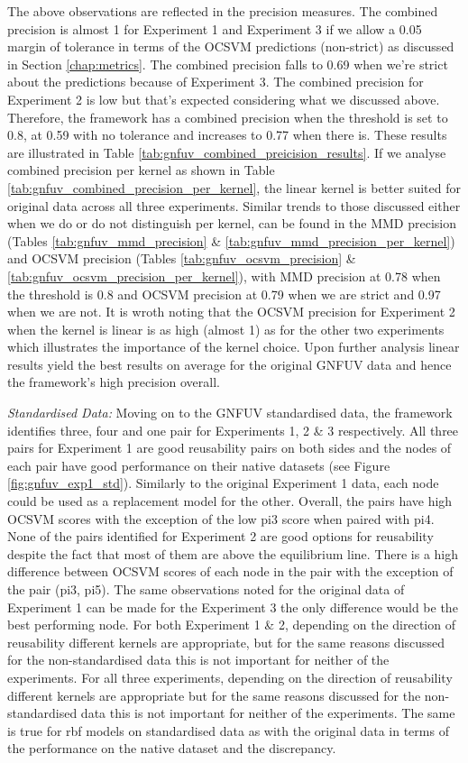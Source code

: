 \documentclass{mpaper}
\begin{document}
The above observations are reflected in the precision measures. The combined precision is almost 1 for Experiment 1 and Experiment 3 if we allow a 0.05 margin of tolerance in terms of the OCSVM predictions (non-strict) as discussed in Section \ref{chap:metrics}. The combined precision falls to 0.69 when we're strict about the predictions because of Experiment 3. The combined precision for Experiment 2 is low but that's expected considering what we discussed above. Therefore, the framework has a combined precision when the threshold is set to 0.8, at 0.59 with no tolerance and increases to 0.77 when there is. These results are illustrated in Table \ref{tab:gnfuv_combined_preicision_results}. If we analyse combined precision per kernel as shown in Table \ref{tab:gnfuv_combined_precision_per_kernel}, the linear kernel is better suited for original data across all three experiments. Similar trends to those discussed either when we do or do not distinguish per kernel, can be found in the MMD precision (Tables \ref{tab:gnfuv_mmd_precision} \& \ref{tab:gnfuv_mmd_precision_per_kernel}) and OCSVM precision (Tables \ref{tab:gnfuv_ocsvm_precision} \& \ref{tab:gnfuv_ocsvm_precision_per_kernel}), with MMD precision at 0.78 when the threshold is 0.8 and OCSVM precision at 0.79 when we are strict and 0.97 when we are not. It is wroth noting that the OCSVM precision for Experiment 2 when the kernel is linear is as high (almost 1) as for the other two experiments which illustrates the importance of the kernel choice. Upon further analysis linear results yield the best results on average for the original GNFUV data and hence the framework's high precision overall.

\textit{Standardised Data:} {} Moving on to the GNFUV standardised data, the framework identifies three, four and one pair for Experiments 1, 2 \& 3 respectively. All three pairs for Experiment 1 are good reusability pairs on both sides and the nodes of each pair have good performance on their native datasets (see Figure \ref{fig:gnfuv_exp1_std}). Similarly to the original Experiment 1 data, each node could be used as a replacement model for the other. Overall, the pairs have high OCSVM scores with the exception of the low pi3 score when paired with pi4. None of the pairs identified for Experiment 2 are good options for reusability despite the fact that most of them are above the equilibrium line. There is a high difference between OCSVM scores of each node in the pair with the exception of the pair (pi3, pi5). The same observations noted for the original data of Experiment 1 can be made for the Experiment 3 the only difference would be the best performing node. For both Experiment 1 \& 2, depending on the direction of reusability different kernels are appropriate, but for the same reasons discussed for the non-standardised data this is not important for neither of the experiments. For all three experiments, depending on the direction of reusability different kernels are appropriate but for the same reasons discussed for the non-standardised data this is not important for neither of the experiments. The same is true for rbf models on standardised data as with the original data in terms of the performance on the native dataset and the discrepancy.
\end{document}
